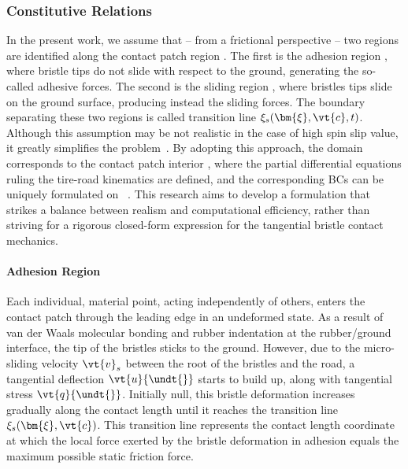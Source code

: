 
\subsubsection{Constitutive Relations}
\label{app3:sec:constitutive_relations}

In the present work, we assume that -- from a frictional perspective -- two regions are identified along the contact patch region \cp{}. The first is the adhesion region \adh{}, where bristle tips do not slide with respect to the ground, generating the so-called adhesive forces. The second is the sliding region \sli{}, where bristles tips slide on the ground surface, producing instead the sliding forces. The boundary separating these two regions is called transition line $\xi_s(\bm{\xi},\vt{c},t)$. Although this assumption may be not realistic in the case of high spin slip value, it greatly simplifies the problem~\cite{romano2022advanced}. By adopting this approach, the domain corresponds to the contact patch interior , where the partial differential equations ruling the tire-road kinematics are defined, and the corresponding \acp{BC} can be uniquely formulated on ~\cite{romano2022analytical}. This research aims to develop a formulation that strikes a balance between realism and computational efficiency, rather than striving for a rigorous closed-form expression for the tangential bristle contact mechanics.

\paragraph{Adhesion Region}

Each individual, material point, acting independently of others,  enters the contact patch through the leading edge in an undeformed state.  As a result of van der Waals molecular bonding and rubber indentation at the rubber/ground interface, the tip of the bristles sticks to the ground. However, due to the micro-sliding velocity $\vt{v}_s$ between the root of the bristles and the road, a tangential deflection $\vt{u}{\undt{}}$ starts to build up, along with tangential stress $\vt{q}{\undt{}}$. Initially null, this bristle deformation increases gradually along the contact length until it reaches the transition line $\xi_s(\bm{\xi},\vt{c})$. This transition line represents the contact length coordinate at which the local force exerted by the bristle deformation in adhesion equals the maximum possible static friction force.

